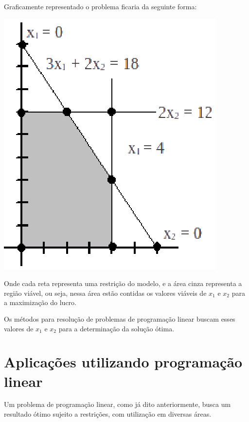 Graficamente representado o problema ficaria da seguinte forma:
\begin{center}
	\includegraphics[scale=1.0]{graficos/simplex_graf}
	\label{img:simplex_grafico}
\end{center}

Onde cada reta representa uma restrição do modelo, e a área cinza representa a região viável, ou seja, nessa área estão contidas os valores viáveis de $x_{1}$ e $x_{2}$ para a maximização do lucro.

Os métodos para resolução de problemas de programação linear buscam esses valores de $x_{1}$ e $x_{2}$  para a determinação da solução ótima.

\section{Aplicações utilizando programação linear}
Um problema de programação linear, como já dito anteriormente, busca um resultado ótimo sujeito a restrições, com utilização em diversas áreas.

